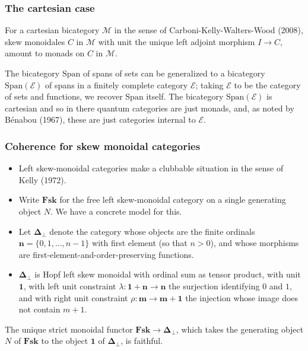\documentclass{beamer}
\newcommand{\lra}{\longrightarrow}
\def\CE{{\mathscr E}}
\def\CM{{\mathscr M}}
\begin{document}
 \begin{frame}
  \frametitle{The cartesian case}

\begin{theorem} 
For a cartesian bicategory $\CM$ in the sense of Carboni-Kelly-Walters-Wood (2008), 
skew monoidales $C$ in $\CM$ with unit the unique left adjoint morphism $I\to C$, 
amount to monads on $C$ in $\CM$.
\end{theorem}
\bigskip
The bicategory $\mathrm{Span}$ of spans of sets can be generalized to 
a bicategory $\mathrm{Span}(\CE)$ of spans in a finitely complete 
category $\CE$; taking $\CE$ to be the category of sets and functions, 
we recover $\mathrm{Span}$ itself.
The bicategory $\mathrm{Span}(\CE)$ is cartesian and so
in there quantum categories are just monads, 
and, as noted by B\'enabou (1967), 
these are just categories internal to $\CE$.
\end{frame}

 \begin{frame}
  \frametitle{Coherence for skew monoidal categories}
  \begin{itemize}
\item Left skew-monoidal categories make a clubbable situation in the sense of Kelly (1972). 
\pause
\item Write $\mathbf{Fsk}$ for the free left skew-monoidal category on a single generating object $N$. 
We have a concrete model for this.
\pause
\item Let $\mathbf{\Delta}_{\bot}$ denote the category whose objects are the finite ordinals 
$\mathbf{n} = \{0,1,\dots , n-1\}$
with first element (so that $n>0$), 
and whose morphisms are first-element-and-order-preserving functions.
\pause
\item $\mathbf{\Delta}_{\bot}$ is Hopf left skew monoidal with ordinal sum as
tensor product, with unit $\mathbf{1}$, with left unit constraint $\lambda : \mathbf{1+n}\lra \mathbf{n}$
the surjection identifying $0$ and $1$, and with right unit constraint $\rho : \mathbf{m}\lra \mathbf{m+1}$ the injection whose image does not contain $m+1$.   
\end{itemize}
\pause
\begin{theorem}
The unique strict monoidal functor $\mathbf{Fsk} \lra \mathbf{\Delta}_{\bot}$, which takes the 
generating object $N$ of $\mathbf{Fsk}$ to the object $\mathbf{1}$ of 
$\mathbf{\Delta}_{\bot}$, is faithful.  
\end{theorem}
\end{frame}
\end{document}
